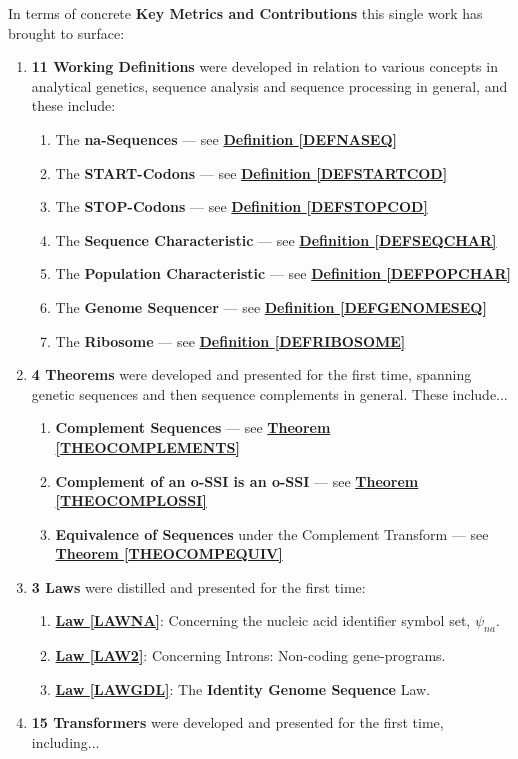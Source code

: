 \documentclass[a4paper, 18pt]{book} %
\begin{document}
In terms of concrete \textbf{Key Metrics and Contributions} this single work has brought to surface:
\begin{enumerate}
\item{ \textbf{11 Working Definitions} were developed in relation to various concepts in analytical genetics, sequence analysis and sequence processing in general, and these include:

	\begin{enumerate}
	\item The \textbf{na-Sequences} --- see  \textbf{\hyperref[DEFNASEQ]{Definition \ref{DEFNASEQ}}}
	\item The \textbf{START-Codons} --- see \textbf{\hyperref[DEFSTARTCOD]{Definition \ref{DEFSTARTCOD}}}
		\item The \textbf{STOP-Codons} --- see \textbf{\hyperref[DEFSTOPCOD]{Definition \ref{DEFSTOPCOD}}}
	\item The \textbf{Sequence Characteristic} --- see  \textbf{\hyperref[DEFSEQCHAR]{Definition \ref{DEFSEQCHAR}}}
	\item The \textbf{Population Characteristic} --- see  \textbf{\hyperref[DEFPOPCHAR]{Definition \ref{DEFPOPCHAR}}}
	\item The \textbf{Genome Sequencer} --- see  \textbf{\hyperref[DEFGENOMESEQ]{Definition \ref{DEFGENOMESEQ}}}
	\item The \textbf{Ribosome} --- see  \textbf{\hyperref[DEFRIBOSOME]{Definition \ref{DEFRIBOSOME}}}
	\end{enumerate}

}
\item{ \textbf{4 Theorems} were developed and presented for the first time, spanning genetic sequences and then sequence complements in general. These include...

	\begin{enumerate}
	\item \textbf{Complement Sequences} --- see  \textbf{\hyperref[THEOCOMPLEMENTS]{Theorem \ref{THEOCOMPLEMENTS}}}
	\item \textbf{Complement of an o-SSI is an o-SSI} --- see  \textbf{\hyperref[THEOCOMPLOSSI]{Theorem \ref{THEOCOMPLOSSI}}} 
	\item \textbf{Equivalence of Sequences} under the Complement Transform  --- see  \textbf{\hyperref[THEOCOMPEQUIV]{Theorem \ref{THEOCOMPEQUIV}}} 
	\end{enumerate}
}
\item {\textbf{3 Laws} were distilled and presented for the first time:
	\begin{enumerate}
	\item \textbf{\hyperref[LAWNA]{Law \ref{LAWNA}}}: Concerning the nucleic acid identifier symbol set, $\psi_{na}$. 
	\item \textbf{\hyperref[LAW2]{Law \ref{LAW2}}}: Concerning Introns: Non-coding gene-programs.
	\item \textbf{\hyperref[LAWGDL]{Law \ref{LAWGDL}}}: The \textbf{Identity Genome Sequence} Law.
	\end{enumerate}
}
\item{ \textbf{15 Transformers} were developed and presented for the first time, including...

}
\end{enumerate}
\end{document}
